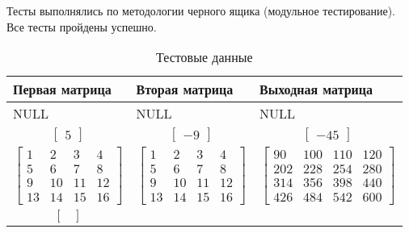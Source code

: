 Тесты выполнялись по методологии черного ящика (модульное тестирование). Все тесты пройдены успешно.

\begin{table}[H]
\caption{Тестовые данные}
\label{tabular:testsdata}
\begin{tabular}{|p{4.5cm}|p{4.5cm}|p{6.8cm}|}
\hline
\textbf{Первая матрица} & \textbf{Вторая матрица} & \textbf{Выходная матрица} \tabularnewline
\hline
NULL & NULL & NULL \tabularnewline
\hline
\begin{equation*}
\begin{bmatrix}
5
\end{bmatrix}
\end{equation*} 
&
\begin{equation*}
\begin{bmatrix}
-9
\end{bmatrix}
\end{equation*} 
&
\begin{equation*}
\begin{bmatrix}
-45
\end{bmatrix}
\end{equation*} \tabularnewline
\hline
\begin{equation*}
\begin{bmatrix}
1 & 2 & 3 & 4 \\
5 & 6 & 7 & 8 \\
9 & 10 & 11 & 12 \\
13 & 14 & 15 & 16
\end{bmatrix}
\end{equation*}
&
\begin{equation*}
\begin{bmatrix}
1 & 2 & 3 & 4 \\
5 & 6 & 7 & 8 \\
9 & 10 & 11 & 12 \\
13 & 14 & 15 & 16
\end{bmatrix}
\end{equation*} 
& 
\begin{equation*}
\begin{bmatrix}
90 & 100 & 110 & 120 \\
202 & 228 & 254 & 280 \\
314 & 356 & 398 & 440 \\
426 & 484 & 542 & 600
\end{bmatrix}
\end{equation*} \tabularnewline
\hline
\begin{equation*}
\begin{bmatrix}

\end{bmatrix}
\end{equation*}
\end{tabular}
\end{table}

